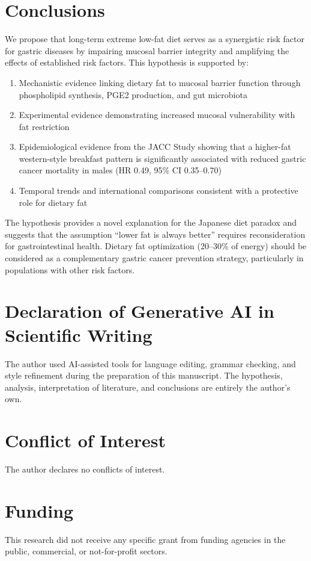 \documentclass[review]{elsarticle}
\begin{document}
\section{Conclusions}

We propose that long-term extreme low-fat diet serves as a synergistic risk factor for gastric diseases by impairing mucosal barrier integrity and amplifying the effects of established risk factors. This hypothesis is supported by:

\begin{enumerate}
    \item Mechanistic evidence linking dietary fat to mucosal barrier function through phospholipid synthesis, PGE2 production, and gut microbiota
    \item Experimental evidence demonstrating increased mucosal vulnerability with fat restriction
    \item Epidemiological evidence from the JACC Study showing that a higher-fat western-style breakfast pattern is significantly associated with reduced gastric cancer mortality in males (HR 0.49, 95\% CI 0.35--0.70)
    \item Temporal trends and international comparisons consistent with a protective role for dietary fat
\end{enumerate}

The hypothesis provides a novel explanation for the Japanese diet paradox and suggests that the assumption ``lower fat is always better'' requires reconsideration for gastrointestinal health. Dietary fat optimization (20--30\% of energy) should be considered as a complementary gastric cancer prevention strategy, particularly in populations with other risk factors.

\section*{Declaration of Generative AI in Scientific Writing}

The author used AI-assisted tools for language editing, grammar checking, and style refinement during the preparation of this manuscript. The hypothesis, analysis, interpretation of literature, and conclusions are entirely the author's own.

\section*{Conflict of Interest}

The author declares no conflicts of interest.

\section*{Funding}

This research did not receive any specific grant from funding agencies in the public, commercial, or not-for-profit sectors.


\end{document}
